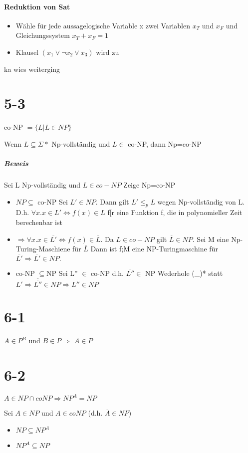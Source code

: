 \documentclass[12pt, oneside, a4paper, numbers=enddot, abstracton, parskip=full]{scrreprt}
\begin{document}
\paragraph{Reduktion von Sat}
\begin{itemize}
\item Wähle für jede aussagelogische Variable x zwei Variablen $x_T$ und $x_F$ und Gleichungssystem
  $x_T + x_F = 1$
\item Klausel $(x_1 \vee \neg x_2 \vee x_3)$ wird zu
\end{itemize}
ka wies weiterging
\section{5-3}
co-NP $=\{ L | \overline{L} \in NP \}$

Wenn $L\subseteq \Sigma*$ Np-vollständig und $L\in$ co-NP, dann Np=co-NP

\subparagraph{Beweis}
Sei L Np-vollständig und $L\in co-NP$  Zeige Np=co-NP
\begin{itemize}
\item $NP\subseteq$ co-NP
  Sei $L' \in NP$. Dann gilt $L'\leq_p L$ wegen Np-vollständig von L. D.h.
  $\forall x. x\in L' \Leftrightarrow f(x) \in L$ f[r eine Funktion f, die in polynomieller Zeit
    berechenbar ist
  \item $\Rightarrow \forall x. x\in \overline{L'} \Leftrightarrow f(x) \in \overline{L}$.
    Da $L\in co-NP$ gilt $\overline{L} \in NP.$ Sei M eine Np-Turing-Maschiene für $\overline{L}$ Dann ist f;M eine NP-Turingmaschine für $\overline{L'} \Rightarrow \overline{L'} \in NP.$
  \item co-NP $\subseteq$NP Sei L'' $\in$ co-NP d.h. $\overline{L''} \in$ NP
    Wederhole (\_)* statt $L'\Rightarrow \overline{\overline{L''}} \in NP \Rightarrow L'' \in NP$
\end{itemize}

\section{6-1}
$A \in P^B$ und $B \in P \Rightarrow$ $A \in P$

\section{6-2}
$A \in NP \cap coNP \Rightarrow NP^A = NP$

Sei $A\in NP$ und $A\in coNP$ (d.h. $\overline{A} \in NP$)
\begin{itemize}
\item $NP \subseteq NP^A$
\item $NP^A \subseteq NP$
\end{itemize}
\end{document}
